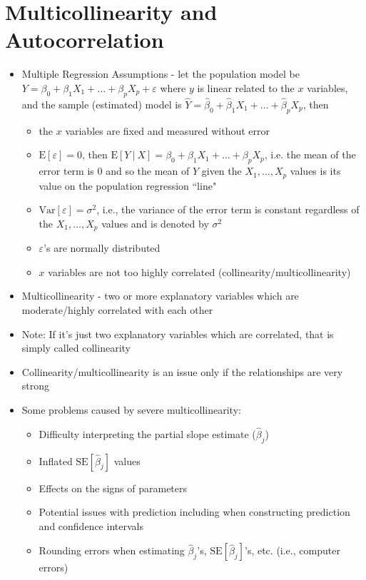\documentclass[12pt]{article}
\begin{document}
\section{Multicollinearity and Autocorrelation}
\begin{itemize}
\item Multiple Regression Assumptions - let the population model be $Y = \beta_0 + \beta_1X_1 + \dots + \beta_pX_p + \varepsilon$ where $y$ is linear related to the $x$ variables, and the sample (estimated) model is $\hat{Y} = \hat{\beta}_0 + \hat{\beta}_1X_1 + \dots + \hat{\beta}_pX_p$, then \begin{itemize} 
\item the $x$ variables are fixed and measured without error 
\item $\text{E}[\varepsilon] = 0$, then $\text{E}[Y~|~X] = \beta_0 + \beta_1X_1 + \dots + \beta_pX_p$, i.e. the mean of the error term is $0$ and so the mean of $Y$ given the $X_1,\dots,X_p$ values is its value on the population regression ``line"
\item $\text{Var}[\varepsilon] = \sigma^2$, i.e., the variance of the error term is constant regardless of the $X_1,\dots,X_p$ values and is denoted by $\sigma^2$ 
\item $\varepsilon$'s are normally distributed 
\item $x$ variables are not too highly correlated (collinearity/multicollinearity) \end{itemize} 
\item Multicollinearity - two or more explanatory variables which are moderate/highly correlated with each other 
\item Note: If it's just two explanatory variables which are correlated, that is simply called collinearity
\item Collinearity/multicollinearity is an issue only if the relationships are very strong
\item Some problems caused by severe multicollinearity: \begin{itemize} 
\item Difficulty interpreting the partial slope estimate ($\hat{\beta}_j$)
\item Inflated $\text{SE}[\hat{\beta}_j]$ values
\item Effects on the signs of parameters 
\item Potential issues with prediction including when constructing prediction and confidence intervals
\item Rounding errors when estimating $\hat{\beta}_j$'s, $\text{SE}[\hat{\beta}_j]$'s, etc. (i.e., computer errors) \end{itemize} 

\end{itemize}
\end{document}
